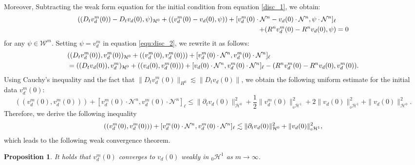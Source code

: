 \documentclass[letterpaper,reqno,10pt,twoside]{amsart}
\newtheorem{proposition}[theorem]{Proposition}
\theoremstyle{definition}
\theoremstyle{remark}
\def\p{\partial}
\begin{document}
	Moreover, Subtracting the weak form equation for the initial condition from equation \eqref{disc_1}, we obtain:
	\begin{align}{\label{equ:disc_2}}
		\begin{aligned}
			((D_{t}v_{d}^{m}(0))-D_{t}v_{d}(0),\psi)_{\mathcal{H}^{0}}+((v_{d}^m(0)-v_{d}(0),\psi))+[v_{d}^{m}(0)\cdot \mathcal{N}^{n}-v_{d}(0)\cdot \mathcal{N}^{n},\psi\cdot\mathcal{N}^{n}]_\ell&\\
			+(R^{n}v_{d}^{m}(0)-R^{n}v_{d}(0),\psi)&=0
		\end{aligned}
	\end{align}
	for any $\psi\in \mathcal{W}^{m}$. Setting $\psi=v_{d}^{m}$ in equation \eqref{equ:disc_2}, we rewrite it as follows:
	\[\begin{aligned}
		&((D_{t}v_{d}^{m}(0)),v_{d}^{m}(0))_{\mathcal{H}^{0}}+((v_{d}^m(0),v_{d}^{m}(0)))
		+[v_{d}^{m}(0)\cdot \mathcal{N}^{n},v_{d}^{m}(0)\cdot\mathcal{N}^{n}]_\ell\notag\\
		&=((D_{t}v_{d}(0)),v_{d}^{m})_{\mathcal{H}^{0}}+((v_{d}(0),v_{d}^{m}(0)))
		+[v_{d}(0)\cdot \mathcal{N}^{n},v_{d}^{m}(0)\cdot\mathcal{N}^{n}]_\ell-(R^{n}v_{d}^{m}(0)-R^{n}v_{d}(0),v_{d}^{m}(0)).
	\end{aligned}\]
	\noindent Using Cauchy's inequality and the fact that $\|D_{t}v_{d}^{m}(0)\|_{H^{0}}\lesssim\|D_{t}v_{d}(0)\|$, we obtain the following uniform estimate for the initial data $v_{d}^{m}(0)$:
	\[
	((v_{d}^m(0),v_{d}^{m}(0)))
	+[v_{d}^{m}(0)\cdot \mathcal{N}^{n},v_{d}^{m}(0)\cdot\mathcal{N}^{n}]_\ell
	\leq \|\p_{t}v_{d}(0)\|^{2}_{\mathcal{H}^{0}}+\frac{1}{2}\|v_{d}^{m}(0)\|^{2}_{{}_0\mathcal{H}^{1}}+2\|v_{d}(0)\|^{2}_{{}_0\mathcal{H}^{1}}+\|v_{d}(0)\|_{\mathcal{H}^{0}}^{2}.
	\]
	\noindent Therefore, we derive the following inequality
	\begin{align}{\label{bound_dtu_0}}
		((v_{d}^m(0),v_{d}^{m}(0)))
		+[v_{d}^{m}(0)\cdot \mathcal{N}^{n},v_{d}^{m}(0)\cdot\mathcal{N}^{n}]_\ell
		\lesssim \|\p_{t}v_{d}(0)\|^{2}_{\mathcal{H}^{0}}+\|v_{d}(0)\|^{2}_{{}_0\mathcal{H}^{1}},
	\end{align}
	\noindent which leads to the following weak convergence theorem.
	\begin{proposition}\label{prop:converge_dtu2}
		It holds that $v_{d}^m(0)$ converges to $v_{d}(0)$ weakly in ${}_0\mathcal{H}^1$ as $m\to \infty$.
	\end{proposition}
	
\end{document}
